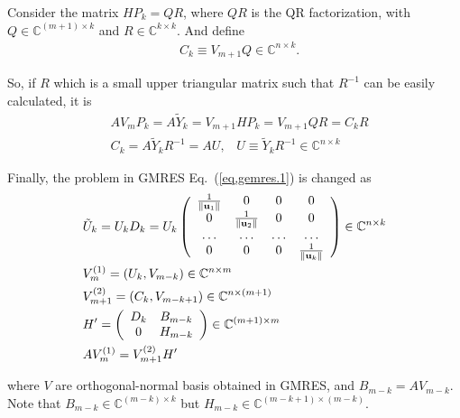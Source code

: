 Consider the matrix $HP_k=QR$, where $QR$ is the QR factorization, with $Q\in \mathbb{C}^{(m+1)\times k}$ and $R\in \mathbb{C}^{k\times k}$. And define
\begin{equation}
\begin{split}
&C_k\equiv V_{m+1}Q\in \mathbb{C}^{n\times k}.
\end{split}
\end{equation}

So, if $R$ which is a small upper triangular matrix such that $R^{-1}$ can be easily calculated, it is
\begin{equation}
\begin{split}
&AV_mP_k=A\tilde{Y}_k=V_{m+1}HP_k=V_{m+1}QR=C_kR\\
&C_k=A\tilde{Y}_kR^{-1}=A U,\;\;\;U\equiv \tilde{Y}_kR^{-1} \in \mathbb{C}^{n\times k}
\end{split}
\end{equation}

Finally, the problem in GMRES Eq.~(\ref{eq,gemres.1}) is changed as
\begin{equation}
\begin{split}
&\tilde{U}_k=U_kD_k=U_k\left(\begin{array}{cccc}
\frac{1}{\|{\bf u}_1\|} & 0 & 0 & 0 \\
0 & \frac{1}{\|{\bf u}_2\|} & 0 & 0 \\
\ldots & \ldots & \ldots & \ldots \\
0 & 0 & 0 & \frac{1}{\|{\bf u}_k\|} \\
\end{array}\right) \in \mathbb{C}^{n\times k}\\
&V^{(1)}_m=(U_k, V_{m-k})\in \mathbb{C}^{n\times m}\\
&V^{(2)}_{m+1}=(C_k, V_{m-k+1})\in \mathbb{C}^{n\times (m+1)}\\
&H'=\left(\begin{array}{cc}
D_k & B_{m-k} \\
0 & H_{m-k}
\end{array}\right) \in \mathbb{C}^{(m+1)\times m}\\
&AV^{(1)}_m=V^{(2)}_{m+1}H'\\
\end{split}
\label{eq.gcrodr.1}
\end{equation}

where $V$ are orthogonal-normal basis obtained in GMRES, and $B_{m-k}=AV_{m-k}$. Note that \textcolor[rgb]{0,0,1}{$B_{m-k}\in \mathbb{C}^{(m-k)\times k}$ but $H_{m-k}\in \mathbb{C}^{(m-k+1)\times (m-k)}$}.

